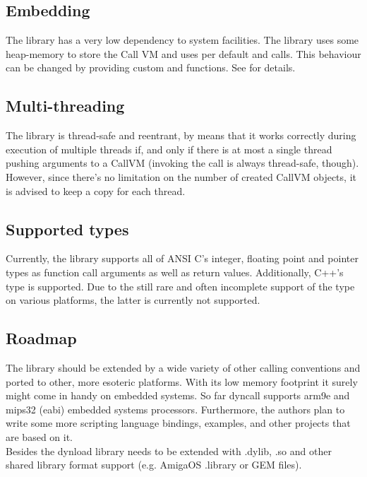 \subsection{Embedding}

The  library has a very low dependency to system facilities.
The library uses some heap-memory to store the Call VM and uses per default
 and  calls. This behaviour can be changed by 
providing custom  and  functions. See  for details.

\subsection{Multi-threading}

The  library is thread-safe and reentrant, by means that it
works correctly during execution of multiple threads if, and only if there is
at most a single thread pushing arguments to a CallVM (invoking the call is
always thread-safe, though). However, since there's no limitation on the
number of created CallVM objects, it is advised to keep a copy for each
thread.


\subsection{Supported types}

Currently, the  library supports all of ANSI C's integer,
floating point and pointer types as function call arguments as well as return
values. Additionally, C++'s  type is supported. Due to the still
rare and often incomplete support of the  type on various
platforms, the latter is currently not supported.


\subsection{Roadmap}

The  library should be extended by a wide variety of other
calling conventions and ported to other, more esoteric platforms. With its low
memory footprint it surely might come in handy on embedded systems. So far
dyncall supports arm9e and mips32 (eabi) embedded systems processors.
Furthermore, the authors plan to write some more scripting language bindings,
examples, and other projects that are based on it.\\
Besides  the dynload library needs to be extended with
.dylib, .so and other shared library format support (e.g. AmigaOS .library or
GEM \cite{.ldg} files).

